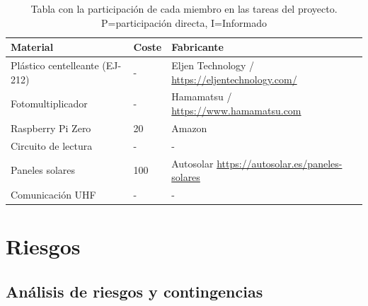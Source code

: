 \documentclass[11pt]{extarticle}
\begin{document}
				\begin{table}[H]
					    \centering
						\begin{tabular}{m{3.5cm} m{1.0cm} m{5.4cm}}
							\hline
							\multicolumn{1}{m{3.5cm}}{\centering \textbf{Material}} &  
							\multicolumn{1}{m{1.0cm}}{\centering \textbf{Coste}} &
							\multicolumn{1}{m{5.4cm}}{\centering \textbf{Fabricante}} \\ \hline
						   	\hline
						   	Plástico centelleante (EJ-212)	& -	&  Eljen Technology / \url{https://eljentechnology.com/} \\ \hline
						    Fotomultiplicador 		& - &	Hamamatsu / \url{https://www.hamamatsu.com}  \\ \hline
						    Raspberry Pi Zero		& 20 & Amazon \\ \hline
						    Circuito de lectura		& - & - \\ \hline
						    Paneles solares			& 100 & Autosolar \url{https://autosolar.es/paneles-solares} \\ \hline
						    Comunicación UHF 		& - & - \\ \hline
					    \end{tabular}
					    \caption{\label{tab:Autonomo} Tabla con la participación de cada miembro en las tareas del proyecto. P=participación directa, I=Informado}
					\end{table}

		\section{Riesgos}
			\label{Sec:}

			\subsection{Análisis de riesgos y contingencias}
				\label{SubSec:}
\end{document}
